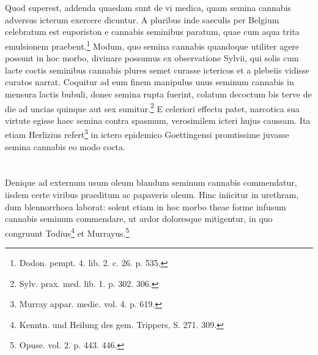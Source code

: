 \documentclass[a4paper, 11pt, oneside, polutonikogreek, english]{article}
\begin{document}
\section{}
\paragraph{}
Quod superest, addenda quaedam sunt de vi medica, quam semina cannabis adversus icterum exercere dicuntur. A pluribus inde saeculis per Belgium celebratum est euporiston e cannabis seminibus paratum, quae cum aqua trita emulsionem praebent.\footnote{Dodon. pempt. 4. lib. 2. c. 26. p. 535.} Modum, quo semina cannabis quandoque utiliter agere possunt in hoc morbo, divinare possumus ex observatione Sylvii, qui solis cum lacte coctis seminibus cannabis plures semet curasse ictericos et a plebeiis vidisse curatos narrat. Coquitur ad eum finem manipulus unus seminum cannabis in mensura lactis bubuli, donec semina rupta fuerint, colatum decoctum bis terve de die ad uncias quinque aut sex sumitur.\footnote{Sylv. prax. med. lib. 1. p. 302. 306.} E celeriori effectu patet, narcotica sua virtute egisse haec semina contra spasmum, verosimilem icteri hujus caussam. Ita etiam Herlizius refert\footnote{Murray appar. medic. vol. 4. p. 619.} in ictero epidemico Goettingensi promtissime juvasse semina cannabis eo modo cocta.
\section{}
\paragraph{}
Denique ad externum usum oleum blandum seminum cannabis commendatur, iisdem certe viribus praeditum ac papaveris oleum. Hinc iniicitur in urethram, dum blennorrhoea laborat: solent etiam in hoc morbo theae forme infusum cannabis seminum commendare, ut ardor doloresque mitigentur, in quo congruunt Todius\footnote{Kenntn. und Heilung des gem. Trippers, S. 271. 309.} et Murrayus.\footnote{Opuse. vol. 2. p. 443. 446.}
\clearpage
\end{document}
